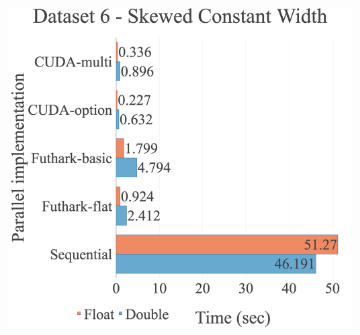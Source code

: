 \begin{figure}[H]
\begin{adjustwidth}{-2cm}{-2cm}
\begin{subfigure}{.62\textwidth}
\end{subfigure}
\par\bigskip
\par\bigskip
\centering
\begin{subfigure}{.62\textwidth}
  \includegraphics[width=1\textwidth]{img/experiments/all-approaches-6_SKEWEDCONSTWIDTH.png}
\end{subfigure}
\end{adjustwidth}
\end{figure}



